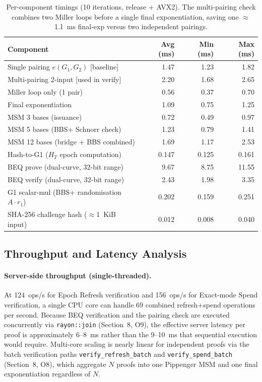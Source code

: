 \documentclass[11pt]{article}
\theoremstyle{definitionstyle}
\theoremstyle{plain}
\begin{document}
\begin{table}[htbp]
\centering
\small
\begin{tabular}{|l|r|r|r|}
\hline
\textbf{Component} & \textbf{Avg (ms)} & \textbf{Min (ms)} & \textbf{Max (ms)} \\
\hline
Single pairing $e(G_1, G_2)$ [baseline]     & 1.47 & 1.23 & 1.82 \\
Multi-pairing 2-input [used in verify]       & 2.20 & 1.68 & 2.65 \\
\quad Miller loop only (1 pair)              & 0.56 & 0.37 & 0.70 \\
\quad Final exponentiation                   & 1.09 & 0.75 & 1.25 \\
\hline
MSM  3 bases (issuance)                      & 0.72 & 0.49 & 0.97 \\
MSM  5 bases (BBS+ Schnorr check)            & 1.23 & 0.79 & 1.41 \\
MSM 12 bases (bridge + BBS combined)         & 1.69 & 1.17 & 2.53 \\
\hline
Hash-to-G1 ($H_T$ epoch computation)         & 0.147 & 0.125 & 0.161 \\
BEQ prove (dual-curve, 32-bit range)         & 9.67 & 8.75 & 11.55 \\
BEQ verify (dual-curve, 32-bit range)        & 2.43 & 1.98 & 3.35 \\
G1 scalar-mul (BBS+ randomisation $A\cdot r_1$) & 0.202 & 0.159 & 0.251 \\
SHA-256 challenge hash ($\approx$1~KiB input)& 0.012 & 0.008 & 0.040 \\
\hline
\end{tabular}
\caption{Per-component timings (10 iterations, release + AVX2).  The
multi-pairing check combines two Miller loops before a single
final exponentiation, saving one $\approx$1.1~ms final-exp versus two
independent pairings.}
\label{tab:components}
\end{table}

\subsection{Throughput and Latency Analysis}

\paragraph{Server-side throughput (single-threaded).}
At 124~ops/s for Epoch Refresh verification and 156~ops/s for Exact-mode Spend
verification, a single CPU core can handle 69 combined refresh+spend
operations per second.  Because BEQ verification and the pairing check
are executed concurrently via \texttt{rayon::join} (Section~8, O9), the
effective server latency per proof is approximately 6--8~ms rather than
the 9--10~ms that sequential execution would require.  Multi-core scaling
is nearly linear for independent proofs via the batch verification paths
\texttt{verify\_refresh\_batch} and \texttt{verify\_spend\_batch}
(Section~8, O8), which aggregate $N$ proofs into one Pippenger MSM and
one final exponentiation regardless of $N$.
\end{document}
